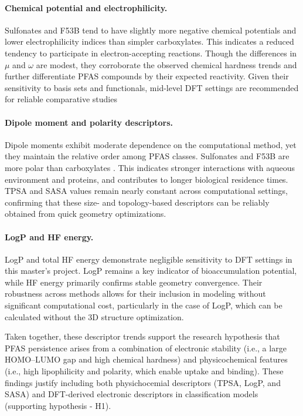 \paragraph{Chemical potential and electrophilicity.} 
Sulfonates and F53B tend to have slightly more negative chemical potentials and lower electrophilicity indices than simpler carboxylates. This indicates a reduced tendency to participate in electron-accepting reactions. Though the differences in \(\mu\) and \(\omega\) are modest, they corroborate the observed chemical hardness trends and further differentiate PFAS compounds by their expected reactivity. Given their sensitivity to basis sets and functionals, mid-level DFT settings are recommended for reliable comparative studies

\paragraph{Dipole moment and polarity descriptors.} 
Dipole moments exhibit moderate dependence on the computational method, yet they maintain the relative order among PFAS classes. Sulfonates and F53B are more polar than carboxylates \cite{pfas_polarity_soil} \cite{pfas_protein_binding_dipole}. This indicates stronger interactions with aqueous environment and proteins, and contributes to longer biological residence times. TPSA and SASA values remain nearly constant across computational settings, confirming that these size- and topology-based descriptors can be reliably obtained from quick geometry optimizations.

\paragraph{LogP and HF energy.} 
LogP and total HF energy demonstrate negligible sensitivity to DFT settings in this master’s project. LogP remains a key indicator of bioaccumulation potential, while HF energy primarily confirms stable geometry convergence. Their robustness across methods allows for their inclusion in modeling without significant computational cost, particularly in the case of LogP, which can be calculated without the 3D structure optimization.

Taken together, these descriptor trends support the research hypothesis that PFAS persistence arises from a combination of electronic stability (i.e., a large HOMO–LUMO gap and high chemical hardness) and physicochemical features (i.e., high lipophilicity and polarity, which enable uptake and binding). These findings justify including both physichocemial descriptors (TPSA, LogP, and SASA) and DFT-derived electronic descriptors in classification models (supporting hypothesis - H1).

